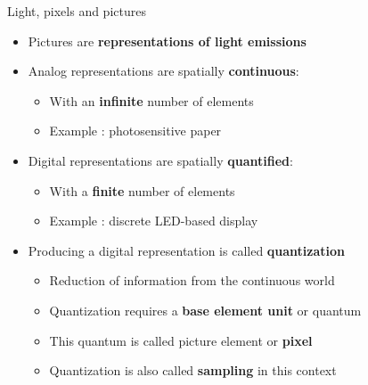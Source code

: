 \begin{frame}{Light, pixels and pictures}
  \begin{minipage}{0.75\textwidth}
  \begin{itemize}
  \item Pictures are {\bf representations of light emissions}
  \item Analog representations are spatially {\bf continuous}:
    \begin{itemize}
    \item With an {\bf infinite} number of elements
    \item Example : photosensitive paper
    \end{itemize}
  \item Digital representations are spatially {\bf quantified}:
    \begin{itemize}
    \item With a {\bf finite} number of elements
    \item Example : discrete LED-based display
    \end{itemize}
  \item Producing a digital representation is called \textbf{quantization}
    \begin{itemize}
    \item Reduction of information from the continuous world
    \item Quantization requires a {\bf base element unit} or quantum
    \item This quantum is called picture element or {\bf pixel}
    \item Quantization is also called \textbf{sampling} in this context
    \end{itemize}
  \end{itemize}
  \end{minipage}%
  \begin{minipage}{0.25\textwidth}

\end{minipage}
\end{frame}
